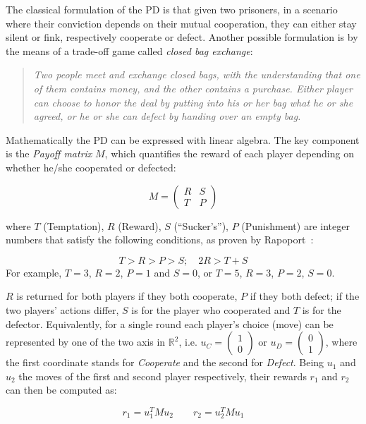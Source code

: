 \documentclass[journal,a4paper,10pt,twoside]{IEEEtran} %
\begin{document}
The classical formulation of the PD is that given two prisoners, in a scenario where their conviction depends on their mutual cooperation, they can either stay silent or fink, respectively cooperate or defect.
Another possible formulation is by the means of a trade-off game called \textit{closed bag exchange}:

\begin{quote}
\textit{Two people meet and exchange closed bags, with the understanding that one of them contains money, and the other contains a purchase. Either player can choose to honor the deal by putting into his or her bag what he or she agreed, or he or she can defect by handing over an empty bag.}
\end{quote}

Mathematically the PD can be expressed with linear algebra. The key component is the \textit{Payoff matrix} $M$, which quantifies the reward of each player depending on whether he/she cooperated or defected:

$$
M = 
\begin{pmatrix} 
R & S \\
T & P 
\end{pmatrix}
$$

where $T$ (Temptation), $R$ (Reward), $S$ (``Sucker's''), $P$ (Punishment) are integer numbers that satisfy the following conditions, as proven by Rapoport~\cite{rapoport}:

$$
T>R>P>S; \quad 2R > T+S 
$$
For example, $T=3$, $R=2$, $P=1$ and $S=0$, or  $T=5$, $R=3$, $P=2$, $S=0$. 

$R$ is returned for both players if they both cooperate, $P$ if they both defect; if the two players' actions differ, $S$ is for the player who cooperated and $T$ is for the defector.
Equivalently, for a single round each player's choice (move) can be represented by one of the two axis in $\mathbb{R}^2$, i.e. $u_C=\begin{pmatrix} 1 \\ 0 \end{pmatrix}$ or $u_D=\begin{pmatrix} 0 \\ 1 \end{pmatrix}$, where the first coordinate stands for \textit{Cooperate} and the second for \textit{Defect}. Being $u_1$ and $u_2$ the moves of the first and second player respectively, their rewards $r_1$ and $r_2$ can then be computed as:

$$
r_1 = u_1^T M u_2
\quad
\quad
r_2 = u_2^T M u_1
$$
\end{document}
